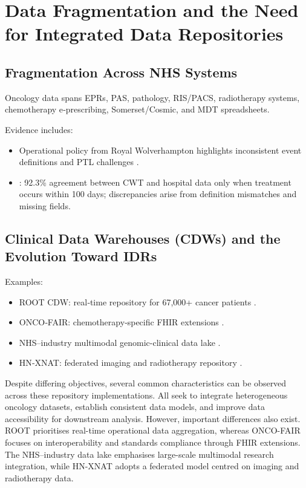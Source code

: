 \section{Data Fragmentation and the Need for Integrated Data Repositories}

\subsection{Fragmentation Across NHS Systems}

Oncology data spans EPRs, PAS, pathology, RIS/PACS, radiotherapy systems, chemotherapy e‑prescribing, Somerset/Cosmic, and MDT spreadsheets.

Evidence includes:

\begin{itemize}
    \item Operational policy from Royal Wolverhampton highlights inconsistent event definitions and PTL challenges \citep{theroyalwolverhamptonnhstrust2024}.
    \item \cite{varma2026}: 92.3\% agreement between CWT and hospital data only when treatment occurs within 100 days; discrepancies arise from definition mismatches and missing fields.
\end{itemize}

\subsection{Clinical Data Warehouses (CDWs) and the Evolution Toward IDRs}

Examples:

\begin{itemize}
    \item ROOT CDW: real‑time repository for 67,000+ cancer patients \citep{jung2021}.
    \item ONCO‑FAIR: chemotherapy‑specific FHIR extensions \citep{guilbert2024}.
    \item NHS–industry multimodal genomic-clinical data lake \citep{conway2025}.
    \item HN‑XNAT: federated imaging and radiotherapy repository \citep{butterworth2025}.
\end{itemize}

Despite differing objectives, several common characteristics can be observed across these repository implementations. All seek to integrate heterogeneous oncology datasets, establish consistent data models, and improve data accessibility for downstream analysis. However, important differences also exist. ROOT prioritises real-time operational data aggregation, whereas ONCO-FAIR focuses on interoperability and standards compliance through FHIR extensions. The NHS–industry data lake emphasises large-scale multimodal research integration, while HN-XNAT adopts a federated model centred on imaging and radiotherapy data.

